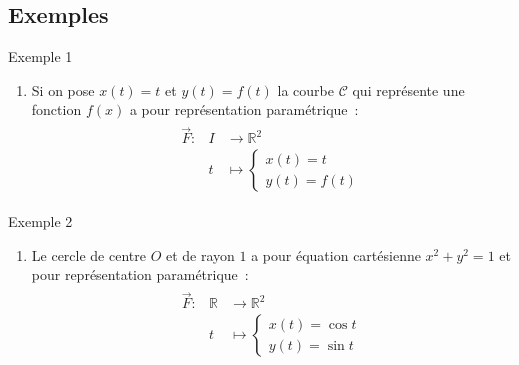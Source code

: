 \documentclass[14pt]{beamer}
\begin{document}
\subsection{Exemples}
\begin{frame}{}
        \begin{exampleblock}{Exemple 1}
                \begin{enumerate}
                        \item Si on pose $x(t)=t$ et $y(t)=f(t)$ la courbe $\mathcal{C}$ qui représente
                                une fonction $f(x)$ a pour représentation paramétrique~:
                \begin{align*}
                \begin{array}{lll}
                        \vec{F}: & I &\to \mathbb{R}^2\\
                        & t &\mapsto \left\{\begin{array}{l}x(t)=t\\y(t)=f(t)\end{array}\right.
                \end{array}
                \end{align*}
                \end{enumerate}
        \end{exampleblock}
\end{frame}
\begin{frame}{}
        \begin{exampleblock}{Exemple 2}
                \begin{enumerate}
        \item Le cercle de centre $O$ et de rayon $1$ a pour équation cartésienne $x^2 + y^2 = 1$
                et pour représentation paramétrique~:
                \begin{align*}
                \begin{array}{lll}
                        \vec{F}: & \mathbb{R} &\to \mathbb{R}^2\\
                        & t &\mapsto \left\{\begin{array}{r}x(t)=\cos t\\y(t)=\sin t\end{array}\right.
                \end{array}
                \end{align*}
                \end{enumerate}
        \end{exampleblock}
\end{frame}
\end{document}
